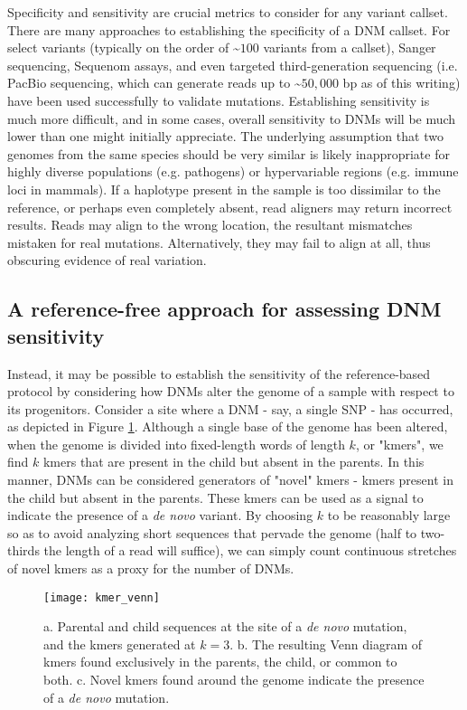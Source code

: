 Specificity and sensitivity are crucial metrics to consider for any variant callset.  There are many approaches to establishing the specificity of a DNM callset.  For select variants (typically on the order of \textasciitilde $100$ variants from a callset), Sanger sequencing, Sequenom assays, and even targeted third-generation sequencing (i.e. PacBio sequencing, which can generate reads up to \textasciitilde $50,000$ bp as of this writing) have been used successfully to validate mutations.  Establishing sensitivity is much more difficult, and in some cases, overall sensitivity to DNMs will be much lower than one might initially appreciate.  The underlying assumption that two genomes from the same species should be very similar is likely inappropriate for highly diverse populations (e.g. pathogens) or hypervariable regions (e.g. immune loci in mammals).  If a haplotype present in the sample is too dissimilar to the reference, or perhaps even completely absent, read aligners may return incorrect results.  Reads may align to the wrong location, the resultant mismatches mistaken for real mutations.  Alternatively, they may fail to align at all, thus obscuring evidence of real variation.

\subsection{A reference-free approach for assessing DNM sensitivity}

Instead, it may be possible to establish the sensitivity of the reference-based protocol by considering how DNMs alter the genome of a sample with respect to its progenitors.  Consider a site where a DNM - say, a single SNP - has occurred, as depicted in Figure \ref{fig:kmer_venn}.  Although a single base of the genome has been altered, when the genome is divided into fixed-length words of length $k$, or "kmers", we find $k$ kmers that are present in the child but absent in the parents.  In this manner, DNMs can be considered generators of "novel" kmers - kmers present in the child but absent in the parents.  These kmers can be used as a signal to indicate the presence of a \textit{de novo} variant.  By choosing $k$ to be reasonably large so as to avoid analyzing short sequences that pervade the genome (half to two-thirds the length of a read will suffice), we can simply count continuous stretches of novel kmers as a proxy for the number of DNMs.

\begin{figure}[h!]
  \centering
    \texttt{[image: kmer\_venn]}
  \caption{a. Parental and child sequences at the site of a \textit{de novo} mutation, and the kmers generated at $k=3$.  b. The resulting Venn diagram of kmers found exclusively in the parents, the child, or common to both.  c. Novel kmers found around the genome indicate the presence of a \textit{de novo} mutation.}
  \label{fig:kmer_venn}
\end{figure}

